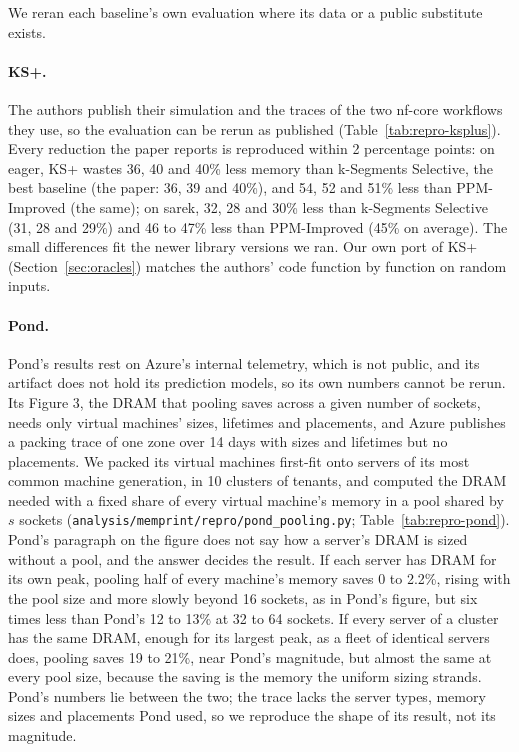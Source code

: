 \documentclass[11pt]{article}
\newcommand{\secref}[1]{Section~\ref{#1}}
\newcommand{\tabref}[1]{Table~\ref{#1}}
\begin{document}
We reran each baseline's own evaluation where its data or a public substitute exists.

\paragraph{KS+.} The authors publish their simulation and the traces of the two nf-core workflows they use, so the
evaluation can be rerun as published (\tabref{tab:repro-ksplus}). Every reduction the paper reports is reproduced
within 2 percentage points: on eager, KS+ wastes 36, 40 and 40\% less memory than k-Segments Selective, the best
baseline (the paper: 36, 39 and 40\%), and 54, 52 and 51\% less than PPM-Improved (the same); on sarek, 32, 28 and 30\%
less than k-Segments Selective (31, 28 and 29\%) and 46 to 47\% less than PPM-Improved (45\% on average). The small
differences fit the newer library versions we ran. Our own port of KS+ (\secref{sec:oracles}) matches the authors' code
function by function on random inputs.

\paragraph{Pond.} Pond's results rest on Azure's internal telemetry, which is not public, and its artifact does not hold
its prediction models, so its own numbers cannot be rerun. Its Figure 3, the DRAM that pooling saves across a given
number of sockets, needs only virtual machines' sizes, lifetimes and placements, and Azure publishes a packing trace of
one zone over 14 days with sizes and lifetimes but no placements. We packed its virtual machines first-fit onto servers of
its most common machine generation, in 10 clusters of tenants, and computed the DRAM needed with a fixed share of every
virtual machine's memory in a pool shared by $s$ sockets (\texttt{analysis/memprint/repro/pond\_pooling.py};
\tabref{tab:repro-pond}). Pond's paragraph on the figure does not say how a server's DRAM is sized without a pool, and the
answer decides the result. If each server has DRAM for its own peak, pooling half of every machine's memory saves 0 to
2.2\%, rising with the pool size and more slowly beyond 16 sockets, as in Pond's figure, but six times less than
Pond's 12 to 13\% at 32 to 64 sockets. If every server of a cluster has the same DRAM, enough for its largest peak, as a
fleet of identical servers does, pooling saves 19 to 21\%, near Pond's magnitude, but almost the same at every pool size,
because the saving is the memory the uniform sizing strands. Pond's numbers lie between the two; the trace lacks the
server types, memory sizes and placements Pond used, so we reproduce the shape of its result, not its magnitude.
\end{document}
